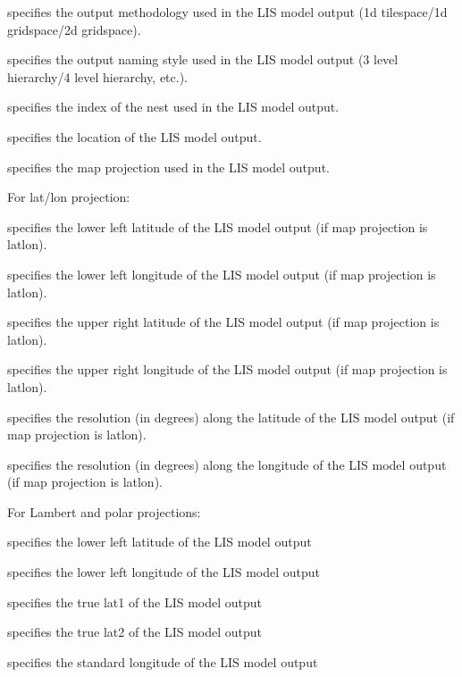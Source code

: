  specifies the output methodology used in the LIS model output
 (1d tilespace/1d gridspace/2d gridspace).

 specifies the output naming style used in the LIS model output 
 (3 level hierarchy/4 level hierarchy, etc.).

 specifies the index of the nest used in the LIS model output.

 specifies the location of the LIS model output.

 specifies the map projection used in the LIS model output.

 For lat/lon projection:

 specifies the lower left latitude of the LIS model output
 (if map projection is latlon).

 specifies the lower left longitude of the LIS model output
 (if map projection is latlon).

 specifies the upper right latitude of the LIS model output
 (if map projection is latlon).

 specifies the upper right longitude of the LIS model output
 (if map projection is latlon).

 specifies the resolution (in degrees) along the latitude of the
 LIS model output (if map projection is latlon).

 specifies the resolution (in degrees) along the longitude of the
 LIS model output (if map projection is latlon).

 For Lambert and polar projections:

 specifies the lower left latitude of the LIS model output

 specifies the lower left longitude of the LIS model output

 specifies the true lat1 of the LIS model output

 specifies the true lat2 of the LIS model output

 specifies the standard longitude of the LIS model output

